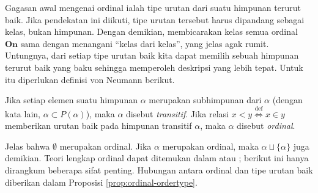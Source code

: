 Gagasan awal mengenai ordinal ialah tipe urutan dari suatu himpunan terurut baik. Jika pendekatan ini diikuti, tipe urutan tersebut harus dipandang sebagai kelas, bukan himpunan. Dengan demikian, membicarakan kelas semua ordinal $\textbf{On}$ sama dengan menangani ``kelas dari kelas'', yang jelas agak rumit. Untungnya, dari setiap tipe urutan baik kita dapat memilih sebuah himpunan terurut baik yang baku sehingga memperoleh deskripsi yang lebih tepat. Untuk itu diperlukan definisi von Neumann berikut.
\begin{definition}\label{def:ordinal}
	Jika setiap elemen suatu himpunan $\alpha$ merupakan subhimpunan dari $\alpha$ (dengan kata lain, $\alpha \subset P(\alpha)$), maka $\alpha$ disebut \emph{transitif}. Jika relasi $x < y \stackrel{\text{def}}{\iff} x \in y$ memberikan urutan baik pada himpunan transitif $\alpha$, maka $\alpha$ disebut \emph{ordinal}.
\end{definition}

Jelas bahwa $\emptyset$ merupakan ordinal. Jika $\alpha$ merupakan ordinal, maka $\alpha \sqcup \{\alpha\}$ juga demikian. Teori lengkap ordinal dapat ditemukan dalam \cite[\S 2]{Je03} atau \cite[Bab 4]{HY14}; berikut ini hanya dirangkum beberapa sifat penting. Hubungan antara ordinal dan tipe urutan baik diberikan dalam Proposisi \ref{prop:ordinal-ordertype}.

